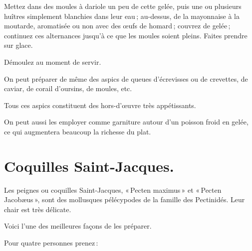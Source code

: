 Mettez dans des moules à dariole un peu de cette gelée, puis une ou plusieurs
huîtres simplement blanchies dans leur eau ; au-dessus, de la mayonnaise à la
moutarde, aromatisée ou non avec des œufs de homard ; couvrez de gelée ;
continuez ces alternances jusqu'à ce que les moules soient pleins. Faites
prendre sur glace.

Démoulez au moment de servir.

\sk


On peut préparer de même des aspics de queues d'écrevisses ou de crevettes, de
caviar, de corail d'oursins, de moules, etc.

\sk

Tous ces aspics constituent des hors-d'œuvre très appétissants.

On peut aussi les employer comme garniture autour d'un poisson froid en gelée,
ce qui augmentera beaucoup la richesse du plat.

\section*{\centering Coquilles Saint-Jacques.}

Les peignes ou coquilles Saint-Jacques, « Pecten maximus » et « Pecten
Jacobæus », sont des mollusques pélécypodes de la famille des Pectinidés. Leur
chair est très délicate.

Voici l’une des meilleures façons de les préparer.

\medskip

Pour quatre personnes prenez :

\medskip

